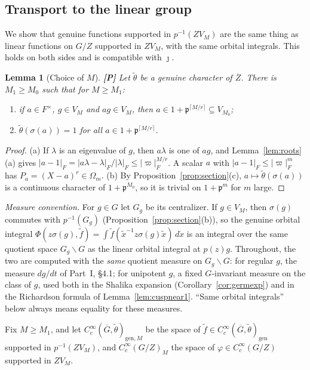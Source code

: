 \documentclass[12pt]{article}
\newcommand{\ov}[1]{\overline{#1}}
\newcommand{\fp}{\mathfrak{p}}
\newcommand{\gen}{\mathrm{gen}}
\newcommand{\Gb}{\ov{G}}
\newcommand{\Zb}{\ov{Z}}
\newcommand{\jj}{\jmath}
\newcommand{\sg}{\sigma}
\newcommand{\Pv}{\textbf{[P]}}
\theoremstyle{plain}
\newtheorem{lemma}[theorem]{Lemma}
\theoremstyle{definition}
\begin{document}
\subsection{Transport to the linear group}\label{subsec:transport}
We show that genuine functions supported in $p^{-1}(ZV_M)$ are the same thing as linear functions on $G/Z$ supported in $ZV_M$, with the same orbital integrals. This holds on both sides and is compatible with $\jj$.

\begin{lemma}[Choice of $M$]\label{lem:chooseM}\Pv
Let $\tilde\theta$ be a genuine character of $\Zb$. There is $M_1\ge M_0$ such that for $M\ge M_1$:
\begin{enumerate}[label=(\alph*)]
\item if $a\in F^\times$, $g\in V_M$ and $ag\in V_M$, then $a\in1+\fp^{\lceil M/r\rceil}\subseteq V_{M_0}$;
\item $\tilde\theta(\sg(a))=1$ for all $a\in1+\fp^{\lceil M/r\rceil}$.
\end{enumerate}
\end{lemma}
\begin{proof}
(a) If $\lambda$ is an eigenvalue of $g$, then $a\lambda$ is one of $ag$, and Lemma~\ref{lem:roots}(a) gives $|a-1|_F=|a\lambda-\lambda|_F/|\lambda|_F\le|\varpi|_F^{M/r}$. A scalar $a$ with $|a-1|_F\le|\varpi|_F^m$ has $P_a=(X-a)^r\in\Omega_m$. (b) By Proposition~\ref{prop:section}(c), $a\mapsto\tilde\theta(\sg(a))$ is a continuous character of $1+\fp^{M_0}$, so it is trivial on $1+\fp^m$ for $m$ large.
\end{proof}

\emph{Measure convention.} For $g\in G$ let $G_g$ be its centralizer. If $g\in V_M$, then $\sg(g)$ commutes with $p^{-1}(G_g)$ (Proposition~\ref{prop:section}(b)), so the genuine orbital integral $\Phi(z\sg(g),\tilde f)=\int\tilde f(\tilde x^{-1}z\sg(g)\tilde x)\,d\dot x$ is an integral over the same quotient space $G_g\backslash G$ as the linear orbital integral at $p(z)g$. Throughout, the two are computed with the \emph{same} quotient measure on $G_g\backslash G$: for regular $g$, the measure $dg/dt$ of Part~I, \S4.1; for unipotent $g$, a fixed $G$-invariant measure on the class of $g$, used both in the Shalika expansion (Corollary~\ref{cor:germexp}) and in the Richardson formula of Lemma~\ref{lem:cuspnear1}. ``Same orbital integrals'' below always means equality for these measures.

Fix $M\ge M_1$, and let $C_c^\infty(\Gb,\tilde\theta)_{\gen,M}$ be the space of $\tilde f\in C_c^\infty(\Gb,\tilde\theta)_\gen$ supported in $p^{-1}(ZV_M)$, and $C_c^\infty(G/Z)_M$ the space of $\varphi\in C_c^\infty(G/Z)$ supported in $ZV_M$.
\end{document}
